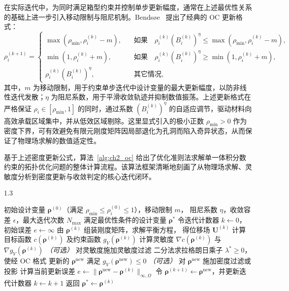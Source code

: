 在实际迭代中，为同时满足箱型约束并控制单步更新幅度，通常在上述最优性关系的基础上进一步引入移动限制与阻尼机制。Bendsøe~\cite{bendsoeOptimizationStructuralTopology1995a} 提出了经典的 OC 更新格式：
\begin{equation} \label{eq:ch2_oc_update}
	\rho_i^{(k+1)} = 
	\begin{cases} 
		\max(\rho_{\min},\rho_i^{(k)}-m),\quad&\text{如果}\quad \rho_i^{(k)}(B_i^{(k)})^\eta \leq \max(\rho_{\min},\rho_i^{(k)}-m),\\ 
		\min(1,\rho_i^{(k)}+m),\quad&\text{如果}\quad \rho_i^{(k)}(B_i^{(k)})^\eta \geq \min(1,\rho_i^{(k)}+m),\\ 
		\rho_i^{(k)}(B_i^{(k)})^\eta,\quad&\text{其它情况}, 
	\end{cases}
\end{equation}
其中，$m$ 为移动限制，用于约束单步迭代中设计变量的最大更新幅度，以防非线性迭代发散；$\eta$ 为阻尼系数，用于平滑收敛轨迹并抑制数值振荡。上述更新格式在严格保证 $\rho_i \in [\rho_{\min}, 1]$ 的同时，通过系数 $(B_i^{(k)})^\eta$ 的自适应调节，驱动材料向高效承载区域集中，并从低效区域剔除。这里显式引入的极小正数 $\rho_{\min} > 0$ 作为密度下界，可有效避免有限元刚度矩阵因局部退化为孔洞而陷入奇异状态，从而保证了物理场求解的数值适定性。

基于上述密度更新公式，算法~\ref{alg:ch2_oc} 给出了优化准则法求解单一体积分数约束的拓扑优化问题的整体计算流程。该算法框架清晰地刻画了从物理场求解、灵敏度分析到密度更新与收敛判定的核心迭代闭环。
\begin{algorithm}[h]
	\caption{OC 法求解体积分数约束的拓扑优化问题}
	\label{alg:ch2_oc}
	\begin{spacing}{1.3}
		\begin{algorithmic}[1]
			\Require 初始设计变量 $\boldsymbol{\rho}^{(0)}$（满足
			$\rho_{\min} \leq \rho_i^{(0)} \leq 1$），移动限制 $m$，
			阻尼系数 $\eta$，收敛容差 $\epsilon$，最大迭代次数 $N_{\max}$
			\Ensure 满足最优性条件的设计变量 $\boldsymbol{\rho}^*$
			\State 令迭代计数器 $k \gets 0$，初始误差 $e \gets \infty$
			\State 由 $\boldsymbol{\rho}^{(k)}$ 组装刚度矩阵，求解平衡方程，
			得位移场 $\boldsymbol{U}^{(k)}$
			\State 计算目标函数 $c(\boldsymbol{\rho}^{(k)})$
			及约束函数 $g_V(\boldsymbol{\rho}^{(k)})$
			\State 计算灵敏度 $\nabla c(\boldsymbol{\rho}^{(k)})$
			与 $\nabla g_V(\boldsymbol{\rho}^{(k)})$
			\State \textit{（可选）} 对灵敏度施加灵敏度过滤
			\State 二分法求拉格朗日乘子 $\lambda^* \geq 0$，使经 OC 格式
			更新的 $\boldsymbol{\rho}^{\mathrm{new}}$ 满足
			$g_V(\boldsymbol{\rho}^{\mathrm{new}}) \leq 0$
			\State \textit{（可选）} 对 $\boldsymbol{\rho}^{\mathrm{new}}$
			施加密度过滤或投影
			\State 计算当前更新误差
			$e \gets \|\boldsymbol{\rho}^{\mathrm{new}}
			- \boldsymbol{\rho}^{(k)}\|_{\infty,\Omega}$
			\State 令
			$\boldsymbol{\rho}^{(k+1)} \gets \boldsymbol{\rho}^{\mathrm{new}}$，并更新迭代计数器
			$k \gets k + 1$
			\EndWhile
			\State 返回 $\boldsymbol{\rho}^* \gets \boldsymbol{\rho}^{(k)}$
		\end{algorithmic}
	\end{spacing}
\end{algorithm}


